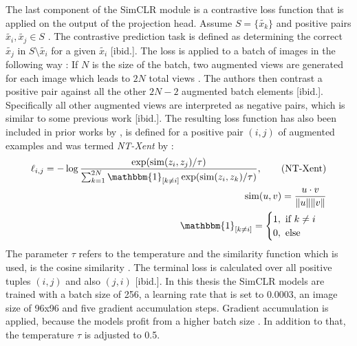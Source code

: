 \par 
The last component of the SimCLR module is a contrastive loss function that is applied on the output of the projection head.
Assume $S=\{{\tilde{x_k}}\}$ and positive pairs $\tilde{x_i}, \tilde{x_j} \in S$ \citep{Chen2020}.
The contrastive prediction task is defined as determining the correct $\tilde{x_j}$ in $S\setminus \tilde{x_i}$ for a given $\tilde{x_i}$ [ibid.].
The loss is applied to a batch of images in the following way \citep{Chen2020}:
If $N$ is the size of the batch, two augmented views are generated for each image which leads to $2N$ total views \citep{Chen2020}.
The authors then contrast a positive pair against all the other $2N-2$ augmented batch elements [ibid.].
Specifically all other augmented views are interpreted as negative pairs, which is similar to some previous work [ibid.].
The resulting loss function has also been included in prior works by \citep{Sohn2016,Wu2018,Oord2018}, is defined for a positive pair $(i,j)$ of augmented examples and was termed \textit{NT-Xent} by \citep{Chen2017}:
\begin{align}
	\ell_{i,j} = -\log\frac{\exp(\text{sim}(z_i,z_j)/\tau)}{\sum_{k=1}^{2N} \mathbbm{1}_{[k \neq i]}\exp(\text{sim}(z_i,z_k)/\tau)}, \tag{NT-Xent}\\
	\text{sim}(u,v) = \frac{u\cdot v}{\Vert u \Vert \Vert v \Vert} \\
	\mathbbm{1}_{[k \neq i]} = \begin{cases}
		1, \text{ if } k \neq i \\
		0, \text{ else}
	\end{cases}
\end{align}
The parameter $\tau$ refers to the temperature and the similarity function which is used, is the cosine similarity \citep{Chen2020}.
The terminal loss is calculated over all positive tuples $(i,j)$ and also $(j,i)$ [ibid.].
In this thesis the SimCLR models are trained with a batch size of 256, a learning rate that is set to $0.0003$, an image size of 96x96 and five gradient accumulation steps.
Gradient accumulation is applied, because the models profit from a higher batch size \citep{Chen2020}.
In addition to that, the temperature $\tau$ is adjusted to 0.5.
